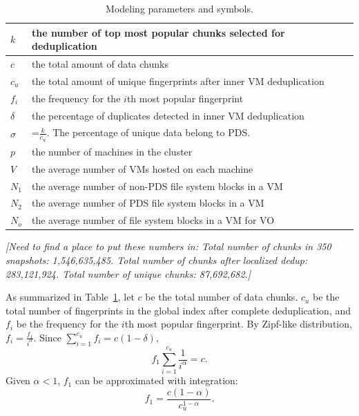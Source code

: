 \begin{table}[ht]
\centering
\begin{tabular}{|p{1.25cm}|p{6.5cm}|}
\hline
$k$ &  the number of top most popular chunks selected for deduplication\\ 
\hline
$c$ &  the total amount of data chunks\\ 
\hline
$c_u$ &  the total amount of unique fingerprints after inner VM  deduplication\\
\hline
$f_i$ &  the frequency for the $i$th most popular fingerprint\\
\hline
$\delta$ &  the percentage of duplicates detected in inner VM deduplication\\
\hline
$\sigma$ & =$\frac{k}{c_u}$.  The percentage of unique data  belong to  PDS.\\
\hline
$p$ & the number of machines in the cluster\\
\hline
$V$ & the average number of VMs hosted on each machine\\
\hline
$N_1$ & the average number  of non-PDS file system blocks  in a VM\\
\hline
$N_2$ & the average number  of PDS file system blocks  in a VM\\
\hline
$N_o$ & the average number  of file system blocks  in a VM for VO\\
\hline
\end{tabular}
\caption{Modeling  parameters and symbols.}
\label{tab:symbol}
\end{table}

{\it [Need to find a place to put these numbers in: Total number of chunks 
in 350 snapshots: 1,546,635,485. 
Total number of chunks after localized dedup: 283,121,924. Total number of unique chunks: 87,692,682.]}

As summarized in Table~\ref{tab:symbol},
let $c$ be the total number of data chunks. 
$c_u$ be the total number of fingerprints 
in the global index after complete deduplication, and
$f_i$ be the frequency for the $i$th most popular fingerprint. 
By Zipf-like distribution, $f_i = \frac{f_1}{i^\alpha}.$
Since $ \sum_{i=1}^{c_u}f_i = c (1-\delta)$,
\[
f_1 \sum_{i=1}^{c_u}\frac{1}{i^\alpha} = c.
\]
Given $\alpha <1$, $f_1$ can be approximated with integration:
\begin{equation}
f_1=\frac{c(1-\alpha)}{c_u^{1-\alpha}}.
\end{equation}


